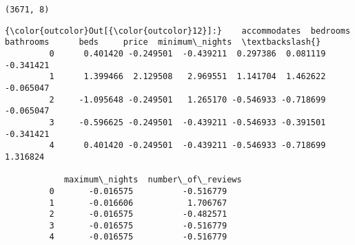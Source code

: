 \documentclass[11pt]{article}
\begin{document}
    \begin{Verbatim}[commandchars=\\\{\}]
(3671, 8)

    \end{Verbatim}

\begin{Verbatim}[commandchars=\\\{\}]
{\color{outcolor}Out[{\color{outcolor}12}]:}    accommodates  bedrooms  bathrooms      beds     price  minimum\_nights  \textbackslash{}
         0      0.401420 -0.249501  -0.439211  0.297386  0.081119       -0.341421   
         1      1.399466  2.129508   2.969551  1.141704  1.462622       -0.065047   
         2     -1.095648 -0.249501   1.265170 -0.546933 -0.718699       -0.065047   
         3     -0.596625 -0.249501  -0.439211 -0.546933 -0.391501       -0.341421   
         4      0.401420 -0.249501  -0.439211 -0.546933 -0.718699        1.316824   
         
            maximum\_nights  number\_of\_reviews  
         0       -0.016575          -0.516779  
         1       -0.016606           1.706767  
         2       -0.016575          -0.482571  
         3       -0.016575          -0.516779  
         4       -0.016575          -0.516779  
\end{Verbatim}
            
\end{document}
